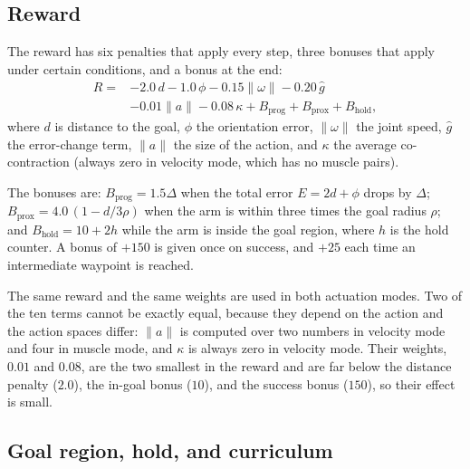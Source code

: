 \documentclass[conference]{IEEEtran}
\begin{document}
\subsection{Reward}

The reward has six penalties that apply every step, three bonuses that apply
under certain conditions, and a bonus at the end:
\begin{equation}
\begin{split}
R = &-2.0\,d - 1.0\,\phi - 0.15\lVert \omega \rVert
     - 0.20\,\hat{g} \\ &- 0.01\lVert a \rVert - 0.08\,\kappa
     + B_{\text{prog}} + B_{\text{prox}} + B_{\text{hold}},
\end{split}
\label{eq:reward}
\end{equation}
where $d$ is distance to the goal, $\phi$ the orientation error,
$\lVert\omega\rVert$ the joint speed, $\hat{g}$ the error-change term,
$\lVert a\rVert$ the size of the action, and $\kappa$ the average
co-contraction (always zero in velocity mode, which has no muscle pairs).

The bonuses are: $B_{\text{prog}} = 1.5\Delta$ when the total error $E = 2d +
\phi$ drops by $\Delta$; $B_{\text{prox}} = 4.0\,(1 - d/3\rho)$ when the arm is
within three times the goal radius $\rho$; and $B_{\text{hold}} = 10 + 2h$
while the arm is inside the goal region, where $h$ is the hold counter. A bonus
of $+150$ is given once on success, and $+25$ each time an intermediate
waypoint is reached.

The same reward and the same weights are used in both actuation modes. Two of
the ten terms cannot be exactly equal, because they depend on the action and
the action spaces differ: $\lVert a \rVert$ is computed over two numbers in
velocity mode and four in muscle mode, and $\kappa$ is always zero in velocity
mode. Their weights, $0.01$ and $0.08$, are the two smallest in the reward and
are far below the distance penalty ($2.0$), the in-goal bonus ($10$), and the
success bonus ($150$), so their effect is small.

\subsection{Goal region, hold, and curriculum}
\label{sec:curriculum}
\end{document}
